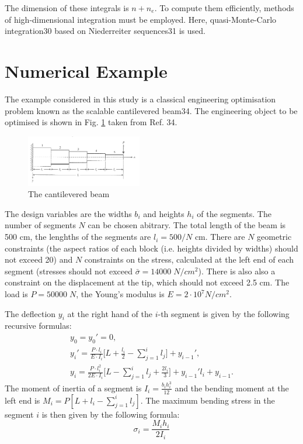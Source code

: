 \documentclass[10pt,twocolumn,a4paper]{article}
\begin{document}
The dimension of these integrals is $n+n_e$. To compute them efficiently, methods of high-dimensional integration must be employed. Here, quasi-Monte-Carlo integration30 based on Niederreiter sequences31 is used.

\section{Numerical Example}
\label{sec:num_example}

The example considered in this study is a classical engineering optimisation problem known as the scalable cantilevered beam34. The engineering object to be optimised is shown in Fig. \ref{fig:beam} taken from Ref. 34.

\begin{figure}[ht]
    \centering
    \includegraphics[width=0.45\textwidth]{images/beam.png}
    \caption{The cantilevered beam}
    \label{fig:beam}
\end{figure}

The design variables are the widths $b_i$ and heights $h_i$ of the segments. The number of segments $N$ can be chosen abitrary. The total length of the beam is 500 cm, the lenghths of the segments are $l_i=500/N$  cm. There are $N$ geometric constraints (the aspect ratios of each block (i.e. heights divided by widths) should not exceed 20) and $N$ constraints on the stress, calculated at the left end of each segment (stresses should not exceed  $\bar{\sigma}=14000\; N/cm^2$). There is also also a constraint on the displacement at the tip, which should not exceed 2.5 cm. The load is $P = 50 000\; N$, the Young's modulus is $E=2\cdot 10^7  N/cm^2$.

The deflection $y_i$ at the right hand of the $i$-th segment is given by the following recursive formulas:
\begin{displaymath}
  \begin{array}{c}
    y_0=y_0'=0, \\
    y_i'=\frac{P\cdot l_i}{E\cdot I_i}\Big[ L+\frac{l_i}{2}-\sum\limits_{j=1}^i l_j\Big]+y_{i-1}', \\
    y_i=\frac{P\cdot l_i^2}{2E\cdot I_i}\Big[L-\sum\limits_{j=1}^i l_j + \frac{2l_i}{3}\Big]+y_{i-1}'l_i+y_{i-1}.
  \end{array}
\end{displaymath}
The moment of inertia of a segment is $I_i=\frac{b_i h_i^3}{12}$ and the bending moment at the left end is $M_i=P[L+l_i- \sum_{j=1}^{i}  l_j ]$. The maximum bending stress in the segment $i$ is then given by the following formula:
\begin{displaymath}
  \sigma_i=\frac{M_i h_i}{2I_i}
\end{displaymath}
\end{document}
